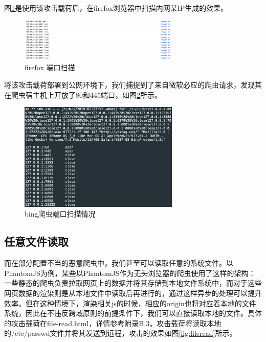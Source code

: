 \documentclass[doctor,privacy,twoside]{buaa_mac}
\begin{document}
图\ref{fig:portscan}是使用该攻击载荷后，在firefox浏览器中扫描内网某IP生成的效果。


\begin{figure}[!h]
  \centering
  \includegraphics[width=0.68\textwidth]{images/portscan.png}
  \caption{firefox 端口扫描}
  \label{fig:portscan}
\end{figure}


将该攻击载荷部署到公网环境下，我们捕捉到了来自微软必应的爬虫请求，发现其在爬虫宿主机上开放了80和445端口，如图\ref{fig:bingscan}所示。

\centerline{}
\begin{figure}[!h]
  \centering
  \includegraphics[width=0.68\textwidth]{images/bing_crawler_portscan.png}
  \caption{bing爬虫端口扫描情况}
  \label{fig:bingscan}
\end{figure}



\subsection{任意文件读取}
而在部分配置不当的恶意爬虫中，我们甚至可以读取任意的系统文件。以PhantomJS为例，某些以PhantomJS作为无头浏览器的爬虫使用了这样的架构：一些静态的爬虫负责拉取网页上的数据并将其存储到本地文件系统中，而对于这些网页数据的渲染则是从本地文件中读取后再进行的，通过这样异步的处理可以提升效率。但在这种情境下，渲染相关js的时候，相应的origin也将对应着本地的文件系统，因此在不违反跨域原则的前提条件下，我们可以直接读取本地的文件。具体的攻击载荷在file-read.html，详情参考附录B.3。攻击载荷将读取本地的/etc/passwd文件并将其发送到远程，攻击的效果如图\ref{fig:fileread}所示。
\end{document}
